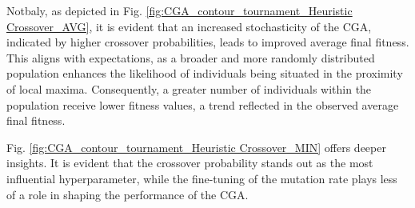 \documentclass[10pt]{article}
\begin{document}
\begin{multicols}{2}
Notbaly, as depicted in Fig. \ref{fig:CGA_contour_tournament_Heuristic Crossover_AVG}, it is evident that an increased stochasticity of the CGA, indicated by higher crossover probabilities, leads to improved average final fitness. This aligns with expectations, as a broader and more randomly distributed population enhances the likelihood of individuals being situated in the proximity of local maxima. Consequently, a greater number of individuals within the population receive lower fitness values, a trend reflected in the observed average final fitness.

Fig. \ref{fig:CGA_contour_tournament_Heuristic Crossover_MIN} offers deeper insights. It is evident that the crossover probability stands out as the most influential hyperparameter, while the fine-tuning of the mutation rate plays less of a role in shaping the performance of the CGA. 


\end{multicols}
\end{document}
